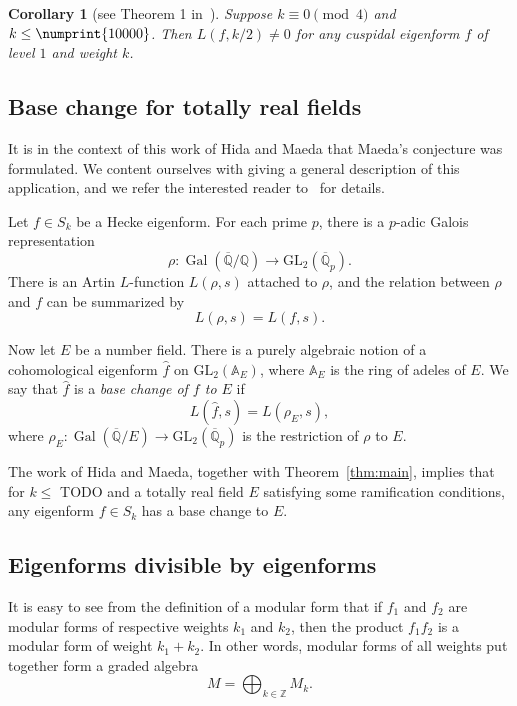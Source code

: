 \documentclass[11pt]{article}
\theoremstyle{plain}
\newtheorem{corollary}[theorem]{Corollary}
\theoremstyle{definition}
\theoremstyle{remark}
\numberwithin{equation}{section}
\newcommand{\longto}{\longrightarrow}
\newcommand{\ZZ}{\mathbb{Z}}
\newcommand{\QQ}{\mathbb{Q}}
\newcommand{\Gal}{\operatorname{Gal}}
\newcommand{\bound}{\numprint{10000}}
\newcommand{\GL}{\mathrm{GL}}
\begin{document}
\begin{corollary}[see Theorem 1 in~\cite{ConreyFarmer}]
  Suppose $k\equiv 0\pmod{4}$ and $k\leq\bound$.  Then
  $L(f, k/2)\neq 0$ for any cuspidal eigenform $f$ of level $1$ and weight $k$.
\end{corollary}

\subsection{Base change for totally real fields}
It is in the context of this work of Hida and Maeda that
Maeda's conjecture was formulated.  We content ourselves with giving a general
description of this application, and we refer the interested reader
to~\cite{HidaMaeda} for details. 

Let $f\in S_k$ be a Hecke eigenform.  For each prime $p$, there is a $p$-adic
Galois representation
\begin{equation*}
  \rho\colon\Gal\left(\overline{\QQ}/\QQ\right)
  \longto\GL_2\left(\overline{\QQ}_p\right).
\end{equation*}
There is an Artin $L$-function $L(\rho, s)$ attached to $\rho$, and the
relation between $\rho$ and $f$ can be summarized by
\begin{equation*}
  L(\rho, s) = L(f, s).
\end{equation*}

Now let $E$ be a number field.  There is a purely algebraic notion of a
cohomological eigenform $\hat{f}$ on $\GL_2(\mathbb{A}_E)$, where 
$\mathbb{A}_E$ is the ring
of adeles of $E$.  We say that $\hat{f}$ is a \emph{base change of $f$ to $E$}
if
\begin{equation*}
  L(\hat{f}, s) = L(\rho_E, s),
\end{equation*}
where $\rho_E\colon\Gal(\overline{\QQ}/E)\longto\GL_2(\overline{\QQ}_p)$ is
the restriction of $\rho$ to $E$.

The work of Hida and Maeda, together with Theorem~\ref{thm:main}, implies that
for $k\leq$ TODO and a totally real field $E$ satisfying some ramification
conditions, any eigenform $f\in S_k$ has a base change to $E$.

\subsection{Eigenforms divisible by eigenforms}
It is easy to see from the definition of a modular form that if $f_1$ and
$f_2$ are modular forms of respective weights $k_1$ and $k_2$, then the
product $f_1f_2$ is a modular form of weight $k_1+k_2$.  In other words,
modular forms of all weights put together form a graded algebra
\begin{equation*}
  M=\bigoplus_{k\in\ZZ} M_k.
\end{equation*}
\end{document}
